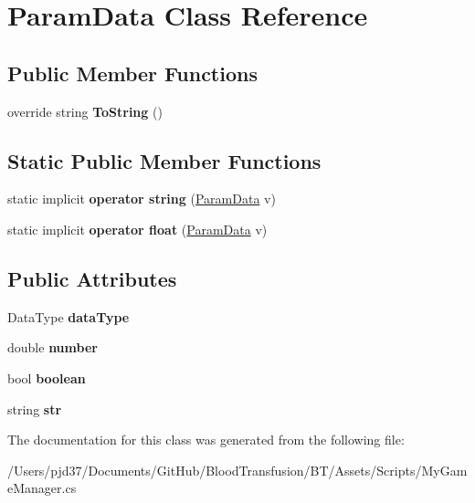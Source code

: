 \hypertarget{class_param_data}{}\section{Param\+Data Class Reference}
\label{class_param_data}
\subsection*{Public Member Functions}
\begin{DoxyCompactItemize}
\item 
override string {\bfseries To\+String} ()\hypertarget{class_param_data_a9e034f800479d5a20cae802f5896ee58}{}\label{class_param_data_a9e034f800479d5a20cae802f5896ee58}

\end{DoxyCompactItemize}
\subsection*{Static Public Member Functions}
\begin{DoxyCompactItemize}
\item 
static implicit {\bfseries operator string} (\hyperlink{class_param_data}{Param\+Data} v)\hypertarget{class_param_data_ad8b00c18f0829667a4acef7794602b1f}{}\label{class_param_data_ad8b00c18f0829667a4acef7794602b1f}

\item 
static implicit {\bfseries operator float} (\hyperlink{class_param_data}{Param\+Data} v)\hypertarget{class_param_data_a23c41200b94fd23f9aca5a2d6da29af6}{}\label{class_param_data_a23c41200b94fd23f9aca5a2d6da29af6}

\end{DoxyCompactItemize}
\subsection*{Public Attributes}
\begin{DoxyCompactItemize}
\item 
Data\+Type {\bfseries data\+Type}\hypertarget{class_param_data_ae35bca41691823ad477c5a06daab3ef3}{}\label{class_param_data_ae35bca41691823ad477c5a06daab3ef3}

\item 
double {\bfseries number}\hypertarget{class_param_data_a33a6fba356d8f87cc9e139b3ff68e39a}{}\label{class_param_data_a33a6fba356d8f87cc9e139b3ff68e39a}

\item 
bool {\bfseries boolean}\hypertarget{class_param_data_a272cafaa80865964dc995c2b2d4e7452}{}\label{class_param_data_a272cafaa80865964dc995c2b2d4e7452}

\item 
string {\bfseries str}\hypertarget{class_param_data_a8dadfc10b65cadf52109e802fa72cb79}{}\label{class_param_data_a8dadfc10b65cadf52109e802fa72cb79}

\end{DoxyCompactItemize}


The documentation for this class was generated from the following file\+:\begin{DoxyCompactItemize}
\item 
/\+Users/pjd37/\+Documents/\+Git\+Hub/\+Blood\+Transfusion/\+B\+T/\+Assets/\+Scripts/My\+Game\+Manager.\+cs\end{DoxyCompactItemize}
